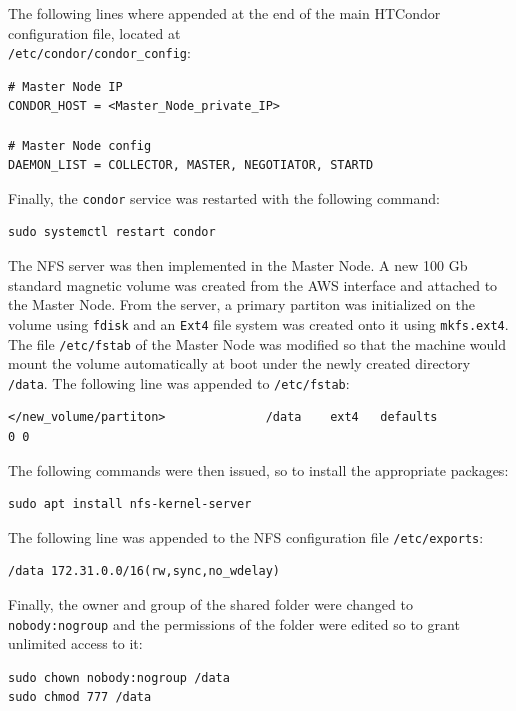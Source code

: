 \documentclass{article}
\begin{document}
The following lines where appended at the end of the main HTCondor configuration file, located at\\
\texttt{/etc/condor/condor\_config}:

\begin{lstlisting}
# Master Node IP
CONDOR_HOST = <Master_Node_private_IP>

# Master Node config 
DAEMON_LIST = COLLECTOR, MASTER, NEGOTIATOR, STARTD
\end{lstlisting}

Finally, the \texttt{condor} service was restarted with the following command:

\begin{lstlisting}
sudo systemctl restart condor
\end{lstlisting}

The NFS server was then implemented in the Master Node.
A new 100 Gb standard magnetic volume was created from the AWS interface and attached to the Master Node.
From the server, a primary partiton was initialized on the volume using \texttt{fdisk} and an \texttt{Ext4} file system was created onto it using \texttt{mkfs.ext4}.
The file \texttt{/etc/fstab} of the Master Node was modified so that the machine would mount the volume automatically at boot under the newly created directory \texttt{/data}.
The following line was appended to \texttt{/etc/fstab}:

\begin{lstlisting}
</new_volume/partiton>              /data    ext4   defaults                0 0
\end{lstlisting}

The following commands were then issued, so to install the appropriate packages:

\begin{lstlisting}
sudo apt install nfs-kernel-server
\end{lstlisting}

The following line was appended to the NFS configuration file \texttt{/etc/exports}:

\begin{lstlisting}
/data 172.31.0.0/16(rw,sync,no_wdelay)
\end{lstlisting}

Finally, the owner and group of the shared folder were changed to \texttt{nobody:nogroup} and the permissions of the folder were edited so to grant unlimited access to it:

\begin{lstlisting}
sudo chown nobody:nogroup /data
sudo chmod 777 /data
\end{lstlisting}
\end{document}
